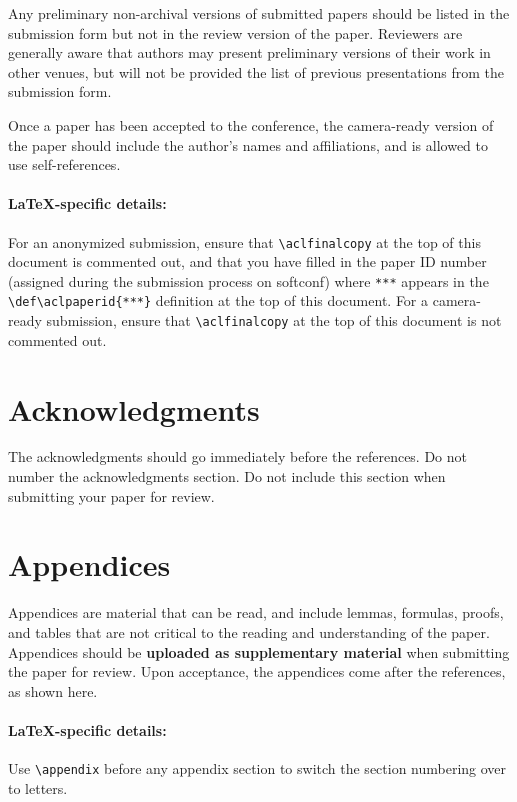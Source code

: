 \documentclass[11pt,a4paper]{article}
\begin{document}
Any preliminary non-archival versions of submitted papers should be listed in the submission form but not in the review version of the paper.
Reviewers are generally aware that authors may present preliminary versions of their work in other venues, but will not be provided the list of previous presentations from the submission form.

Once a paper has been accepted to the conference, the camera-ready version of the paper should include the author's names and affiliations, and is allowed to use self-references.

\paragraph{\LaTeX-specific details:}
For an anonymized submission, ensure that {\small\verb|\aclfinalcopy|} at the top of this document is commented out, and that you have filled in the paper ID number (assigned during the submission process on softconf) where {\small\verb|***|} appears in the {\small\verb|\def\aclpaperid{***}|} definition at the top of this document.
For a camera-ready submission, ensure that {\small\verb|\aclfinalcopy|} at the top of this document is not commented out.






\section*{Acknowledgments}

The acknowledgments should go immediately before the references. Do not number the acknowledgments section.
Do not include this section when submitting your paper for review.




\appendix

\section{Appendices}
\label{sec:appendix}
Appendices are material that can be read, and include lemmas, formulas, proofs, and tables that are not critical to the reading and understanding of the paper. 
Appendices should be \textbf{uploaded as supplementary material} when submitting the paper for review.
Upon acceptance, the appendices come after the references, as shown here.

\paragraph{\LaTeX-specific details:}
Use {\small\verb|\appendix|} before any appendix section to switch the section numbering over to letters.
\end{document}
